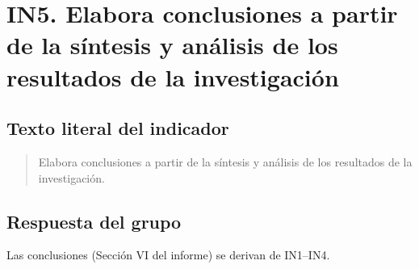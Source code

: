 \section*{IN5. Elabora conclusiones a partir de la síntesis y análisis de los resultados de la investigación}

\subsection*{Texto literal del indicador}
\begin{quote}
Elabora conclusiones a partir de la síntesis y análisis de los resultados de la investigación.
\end{quote}

\subsection*{Respuesta del grupo}
Las conclusiones (Sección VI del informe) se derivan de IN1--IN4.


